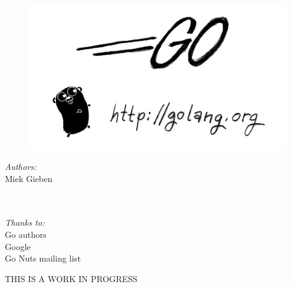 \documentclass[a4paper,twoside]{blocksbook}
\begin{document}
\thispagestyle{empty}
\newcommand{\version}{0.1}
\begin{figure}[t!]
\begin{center}
    \includegraphics[scale=0.65]{fig/bumper-inverse.png}
\end{center}
\end{figure}
\vspace*{5.0cm}
\begin{minipage}{0.4\textwidth}
\begin{flushleft} \large
\hspace*{2,0cm}\emph{Authors:}\\
\hspace*{2.0cm}Miek Gieben\\
\hspace*{2.0cm}\ \\
\hspace*{2.0cm}\
\vfill
\end{flushleft}
\end{minipage}
%
\begin{minipage}{0.4\textwidth}
\begin{flushright} \large
\emph{Thanks to:} \\
Go authors\\
Google\\
Go Nuts mailing list
\vfill
\end{flushright}
\end{minipage}


\vfill
\begin{center}
\hspace*{2.5cm}THIS IS A WORK IN PROGRESS\newline\newline
    \hspace*{1cm}\\[2.5ex]
    \hspace*{1cm}{\tiny\CcNote{\CcLongnameByNcSa}}
\newline\hspace*{1cm}{\tiny Version: \version (\today)}
\end{center}
\end{document}
